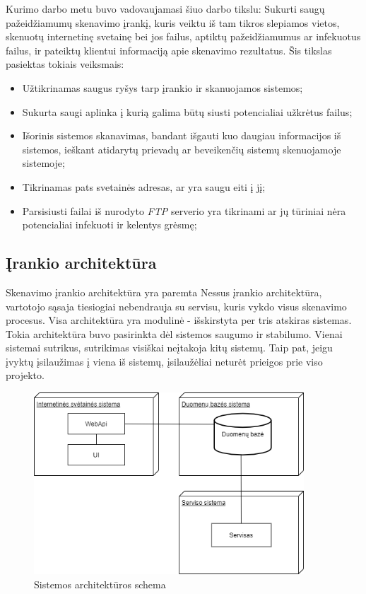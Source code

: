 \documentclass[a4paper,12pt,fleqn]{article}
\begin{document}

Kurimo darbo metu buvo vadovaujamasi šiuo darbo tikslu: Sukurti saugų pažeidžiamumų skenavimo įrankį, kuris veiktu iš tam tikros slepiamos vietos, skenuotų internetinę
svetainę bei jos failus, aptiktų pažeidžiamumus ar infekuotus failus, ir pateiktų klientui informaciją apie skenavimo rezultatus. Šis tikslas pasiektas tokiais veiksmais:
\begin{itemize}
	\item Užtikrinamas saugus ryšys tarp įrankio ir skanuojamos sistemos;
	\item Sukurta saugi aplinka į kurią galima būtų siusti potencialiai užkrėtus failus;
	\item Išorinis sistemos skanavimas, bandant išgauti kuo daugiau informacijos iš sistemos, ieškant atidarytų prievadų ar beveikenčių sistemų skenuojamoje sistemoje;
	\item Tikrinamas pats svetainės adresas, ar yra saugu eiti į jį;
	\item Parsisiusti failai iš nurodyto \textit{FTP} serverio yra tikrinami ar jų tūriniai nėra potencialiai infekuoti ir kelentys grėsmę;
\end{itemize}



\subsection{Įrankio architektūra}

Skenavimo įrankio architektūra yra paremta Nessus įrankio architektūra, vartotojo sąsaja tiesiogiai nebendrauja su servisu, kuris vykdo visus skenavimo procesus. Visa architektūra yra modulinė - išskirstyta per tris atskiras sistemas. Tokia architektūra buvo pasirinkta dėl sistemos saugumo ir stabilumo. Vienai sistemai sutrikus, sutrikimas visiškai neįtakoja kitų sistemų. Taip pat, jeigu įvyktų įsilaužimas į viena iš sistemų, įsilaužėliai neturėt prieigos prie viso projekto.

\begin{figure}[H]
	\centering
	\includegraphics[width=0.9\textwidth]{figs/arch1lt.png}
	\caption{Sistemos architektūros schema}
	\label{fig:arch1}
\end{figure}
\end{document}
